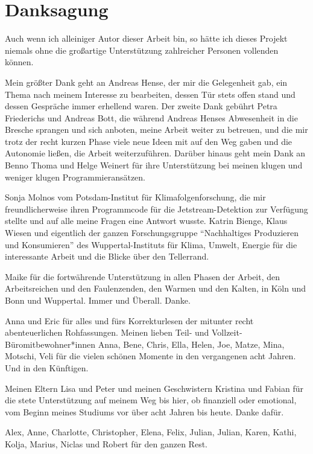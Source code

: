 \chapter*{Danksagung}

{\small
Auch wenn ich alleiniger Autor dieser Arbeit bin, so hätte ich dieses Projekt \mbox{niemals} ohne die großartige Unterstützung zahlreicher Personen vollenden \mbox{können}.

Mein größter Dank geht an Andreas Hense, der mir die Gelegenheit gab, ein Thema nach meinem Interesse zu bearbeiten, dessen Tür stets offen stand und dessen Gespräche immer erhellend waren. Der zweite Dank gebührt Petra Friederichs und Andreas Bott, die während Andreas Henses Abwesenheit in die Bresche sprangen und sich anboten, meine Arbeit weiter zu betreuen, und die mir trotz der recht kurzen Phase viele neue Ideen mit auf den Weg gaben und die Autonomie ließen, die Arbeit weiterzuführen. Darüber hinaus geht mein Dank an Benno Thoma und Helge Weinert für ihre Unterstützung bei meinen klugen und weniger klugen Programmieransätzen.

Sonja Molnos vom Potsdam-Institut für Klimafolgenforschung, die mir freundlicherweise ihren Programmcode für die Jetstream-Detektion zur Verfügung stellte und auf alle meine Fragen eine Antwort wusste. Katrin Bienge, Klaus Wiesen und eigentlich der ganzen Forschungsgruppe \enquote{Nachhaltiges Produzieren und Konsumieren} des Wuppertal-Instituts für Klima, Umwelt, Energie für die interessante Arbeit und die Blicke über den Tellerrand.

Maike für die fortwährende Unterstützung in allen Phasen der Arbeit, den Arbeitsreichen und den Faulenzenden, den Warmen und den Kalten, in Köln und Bonn und Wuppertal. Immer und Überall. Danke.

Anna und Eric für alles und fürs Korrekturlesen der mitunter recht abenteuerlichen Rohfassungen. Meinen lieben Teil- und Vollzeit-Büromitbewohner*innen Anna, Bene, Chris, Ella, Helen, Joe, Matze, Mina, Motschi, Veli für die vielen schönen Momente in den vergangenen acht Jahren. Und in den Künftigen.

Meinen Eltern Lisa und Peter und meinen Geschwistern Kristina und Fabian für die stete Unterstützung auf meinem Weg bis hier, ob finanziell oder emotional, vom Beginn meines Studiums vor über acht Jahren bis heute. Danke dafür.

Alex, Anne, Charlotte, Christopher, Elena, Felix, Julian, Julian, Karen, Kathi, Kolja, Marius, Niclas und Robert für den ganzen Rest.
}
 
